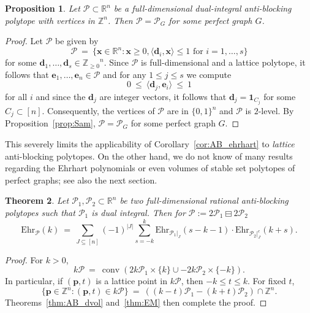 \documentclass[11pt]{amsart}
\newtheorem{thm}{Theorem}[section]
\newtheorem{prop}[thm]{Proposition}
\theoremstyle{definition}
\begin{document}
\begin{prop}\label{AB_perfect}
    Let ${\mathcal{P}} \subset {\mathbb{R}}^n$ be a full-dimensional dual-integral anti-blocking
    polytope with vertices in ${\mathbb{Z}}^n$. Then ${\mathcal{P}} = {\mathcal{P}}_G$ for some perfect
    graph $G$.
\end{prop}
\begin{proof}
    Let ${\mathcal{P}}$ be given by 
    \[
        {\mathcal{P}} \ = \ \{ {\mathbf{x}} \in {\mathbb{R}}^n : {\mathbf{x}} \ge 0, {\langle{{{\mathbf{d}}_i,{\mathbf{x}}}}\rangle} \le 1 \text{ for
        } i=1,\dots,s \}
    \]
    for some ${\mathbf{d}}_1,\dots,{\mathbf{d}}_s \in {\mathbb{Z}_{\ge0}}^n$. Since ${\mathcal{P}}$ is full-dimensional and
    a lattice polytope, it follows that ${\mathbf{e}}_1,\dots,{\mathbf{e}}_n \in {\mathcal{P}}$ and for any
    $1 \le j \le s$ we compute
    \[
        0 \ \le \ {\langle{{{\mathbf{d}}_j, {\mathbf{e}}_i}}\rangle} \ \le \ 1
    \]
    for all $i$ and since the ${\mathbf{d}}_j$ are integer vectors, it follows that
    ${\mathbf{d}}_j = {\mathbf{1}}_{C_j}$ for some $C_j \subset [n]$. Consequently, the vertices
    of ${\mathcal{P}}$ are in $\{0,1\}^n$ and ${\mathcal{P}}$ is $2$-level.  By
    Proposition~\ref{prop:Sam}, ${\mathcal{P}} = {\mathcal{P}}_G$ for some perfect graph $G$. 
\end{proof}

This severely limits the applicability of Corollary~\ref{cor:AB_ehrhart}
to \emph{lattice} anti-blocking polytopes. On the other hand, we do not know of
many results regarding the Ehrhart polynomials or even volumes of stable set
polytopes of perfect graphs; see also the next section.

\begin{thm}\label{thm:Ehr_AB_Cay}
    Let  ${\mathcal{P}}_1,{\mathcal{P}}_2 \subset {\mathbb{R}}^n$ be two full-dimensional rational
    anti-blocking polytopes such that ${\mathcal{P}}_1$ is dual integral. Then for ${\mathcal{P}}
    := {{{2{\mathcal{P}}_1} \boxminus {2{\mathcal{P}}_2}}}$
    \[
        {\mathrm{Ehr}}_{\mathcal{P}}(k) \ = \ \sum_{J \subseteq [n]} (-1)^{|J|}\sum_{s=-k}^k
        {\mathrm{Ehr}}_{{\mathcal{P}}_1|_J}( s-k-1 ) \cdot {\mathrm{Ehr}}_{{\mathcal{P}}_2|_J^c}( k+s).
    \]
\end{thm}
\begin{proof}
    For $k > 0$, 
    \[
        k{\mathcal{P}} \ = \ \operatorname{conv}( 2k{\mathcal{P}}_1 \times \{k\} \cup -2k{\mathcal{P}}_2 \times \{-k\} ).
    \]
    In particular, if $({\mathbf{p}},t)$ is a lattice point in $k{\mathcal{P}}$, then $-k \le t
    \le k$. For fixed $t$, 
    \[
        \{ {\mathbf{p}} \in {\mathbb{Z}}^n : ({\mathbf{p}},t) \in k{\mathcal{P}}\} \ = \ \left((k-t){\mathcal{P}}_1 - (k+t){\mathcal{P}}_2
        \right) \cap {\mathbb{Z}}^n.
    \]
    Theorems~\ref{thm:AB_dvol} and~\ref{thm:EM} then complete the proof.
\end{proof}
\end{document}
